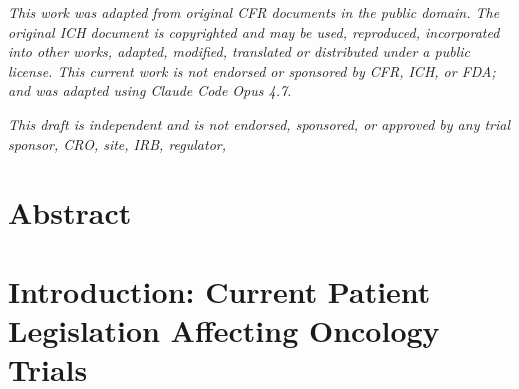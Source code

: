 \documentclass[11pt,letterpaper]{article}
\begin{document}
\vspace{0.15em}

\begin{center}
\footnotesize
\textit{This work was adapted from original CFR documents in the public
domain. The original ICH document is copyrighted and may be used,
reproduced, incorporated into other works, adapted, modified, translated
or distributed under a public license. This current work is not endorsed
or sponsored by CFR, ICH, or FDA; and was adapted using Claude Code
Opus 4.7.}
\end{center}

\vspace{0.15em}

\begin{center}
\footnotesize
\textit{This draft is independent and is not endorsed, sponsored, or
approved by any trial sponsor, CRO, site, IRB, regulator,}
\end{center}

\vspace{0.6em}

\renewcommand{\contentsname}{\centering\large\bfseries\scshape Table of Contents}
\begingroup
\small
\setlength{\parskip}{0pt}
\tableofcontents
\endgroup

\newpage


\section*{Abstract}
\label{sec:abstract}


\section{Introduction: Current Patient Legislation Affecting Oncology Trials}
\label{sec:introduction}

\newpage
\end{document}
